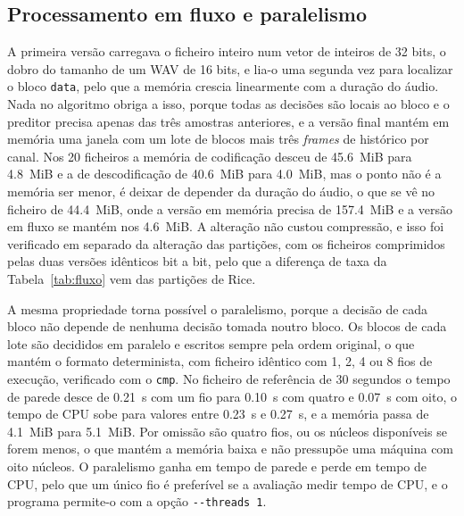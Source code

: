 \documentclass[a4paper,11pt]{article}
\newcommand{\prog}[1]{\texttt{#1}}
\begin{document}
\subsection{Processamento em fluxo e paralelismo}
\label{sec:fluxo}
A primeira versão carregava o ficheiro inteiro num vetor de inteiros de
\num{32} bits, o dobro do tamanho de um WAV de \num{16} bits, e lia-o uma
segunda vez para localizar o bloco \texttt{data}, pelo que a memória crescia
linearmente com a duração do áudio. Nada no algoritmo obriga a isso, porque
todas as decisões são locais ao bloco e o preditor precisa apenas das três
amostras anteriores, e a versão final mantém em memória uma janela com um lote
de blocos mais três \emph{frames} de histórico por canal. Nos 20 ficheiros a
memória de codificação desceu de \SI{45,6}{MiB} para \SI{4,8}{MiB} e a de
descodificação de \SI{40,6}{MiB} para \SI{4,0}{MiB}, mas o ponto não é a memória
ser menor, é deixar de depender da duração do áudio, o que se vê no ficheiro de
\SI{44,4}{MiB}, onde a versão em memória precisa de \SI{157,4}{MiB} e a versão
em fluxo se mantém nos \SI{4,6}{MiB}. A alteração não custou compressão, e isso
foi verificado em separado da alteração das partições, com os ficheiros
comprimidos pelas duas versões idênticos bit a bit, pelo que a diferença de taxa
da Tabela~\ref{tab:fluxo} vem das partições de Rice.

A mesma propriedade torna possível o paralelismo, porque a decisão de cada bloco
não depende de nenhuma decisão tomada noutro bloco. Os blocos de cada lote são
decididos em paralelo e escritos sempre pela ordem original, o que mantém o
formato determinista, com ficheiro idêntico com 1, 2, 4 ou 8 fios de execução,
verificado com o \prog{cmp}. No ficheiro de referência de \num{30} segundos o
tempo de parede desce de \SI{0,21}{\second} com um fio para \SI{0,10}{\second}
com quatro e \SI{0,07}{\second} com oito, o tempo de CPU sobe para valores entre
\SI{0,23}{\second} e \SI{0,27}{\second}, e a memória passa de \SI{4,1}{MiB} para
\SI{5,1}{MiB}. Por omissão são quatro fios, ou os núcleos disponíveis se forem
menos, o que mantém a memória baixa e não pressupõe uma máquina com oito
núcleos. O paralelismo ganha em tempo de parede e perde em tempo de CPU, pelo
que um único fio é preferível se a avaliação medir tempo de CPU, e o programa
permite-o com a opção \texttt{-{}-threads 1}.
\end{document}
